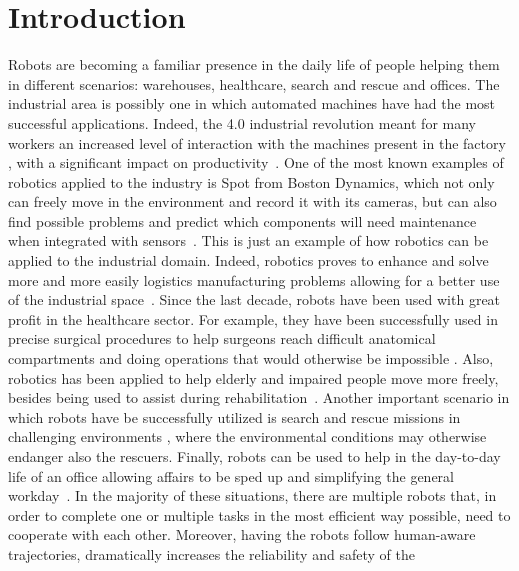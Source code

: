 \chapter{Introduction}
\label{ch:introduction}
Robots are becoming a familiar presence in the daily life of people helping
them in different scenarios: warehouses, healthcare, search and rescue and
offices. \newline
The industrial area is possibly one in which automated machines have had the
most successful applications. Indeed, the 4.0 industrial revolution meant for
many workers an increased level of interaction with the machines present in the
factory \cite{industry4_0}, with a significant impact on
productivity~\cite{coordinationInWarehouse}. One of the most known examples of
robotics applied to the industry is Spot from Boston Dynamics, which not only
can freely move in the environment and record it with its cameras, but can also
find possible problems and predict which components will need maintenance when
integrated with sensors~\cite{bostonDynamics}. This is just an example of how
robotics can be applied to the industrial domain. Indeed, robotics proves to
enhance and solve more and more easily logistics manufacturing problems
allowing for a better use of the industrial
space~\cite{industry4_0_1}.\newline
Since the last decade, robots have been used with great profit in the
healthcare sector. For example, they have been successfully used in precise
surgical procedures to help surgeons reach difficult anatomical compartments
and doing operations that would otherwise be impossible \cite{surgicalRobot}.
Also, robotics has been applied to help elderly and impaired people move more
freely, besides being used to assist during rehabilitation~\cite{friWalker}.
\newline
Another important scenario in which robots have be successfully utilized is
search and rescue missions in challenging environments
\cite{searchRescueDrones}, where the environmental conditions may otherwise
endanger also the rescuers. \newline
Finally, robots can be used to help in the day-to-day life of an office
allowing affairs to be sped up and simplifying the general 
workday~\cite{cobots}.
\newline
In the majority of these situations, there are multiple robots that, in order
to complete one or multiple tasks in the most efficient way possible, need to
cooperate with each other. Moreover, having the robots follow human-aware
trajectories, dramatically increases the reliability and safety of the
